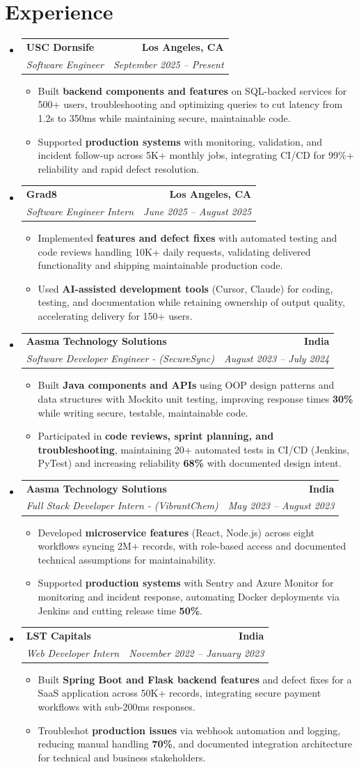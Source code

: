 \documentclass[letterpaper,10pt]{article}
\makeatletter
\newcommand{\resumeItem}[1]{\item\small{{#1 \vspace{-2pt}}}}
\newcommand{\resumeSubheading}[4]{\vspace{-1pt}\item\begin{tabular*}{1.0\textwidth}[t]{l@{\extracolsep{\fill}}r}\textbf{#1} & \textbf{\small #2} \\\textit{\small#3} & \textit{\small #4} \\\end{tabular*}\vspace{-2pt}}
\newcommand{\resumeSubHeadingListStart}{\begin{itemize}[leftmargin=0.0in, label={}]}
\newcommand{\resumeSubHeadingListEnd}{\end{itemize}}
\newcommand{\resumeItemListStart}{\begin{itemize}[leftmargin=0.15in,label=\textbullet,itemsep=2pt,topsep=0pt,parsep=0pt,partopsep=0pt]}
\newcommand{\resumeItemListEnd}{\end{itemize}\vspace{-4pt}}
\makeatother
\begin{document}
\section{Experience}
\resumeSubHeadingListStart
\resumeSubheading{USC Dornsife}{Los Angeles, CA}{Software Engineer}{September 2025 -- Present}
\resumeItemListStart
\resumeItem{Built \textbf{backend components and features} on SQL-backed services for 500+ users, troubleshooting and optimizing queries to cut latency from 1.2s to 350ms while maintaining secure, maintainable code.}
\resumeItem{Supported \textbf{production systems} with monitoring, validation, and incident follow-up across 5K+ monthly jobs, integrating CI/CD for 99\%+ reliability and rapid defect resolution.}
\resumeItemListEnd
\resumeSubheading{Grad8}{Los Angeles, CA}{Software Engineer Intern}{June 2025 -- August 2025}
\resumeItemListStart
\resumeItem{Implemented \textbf{features and defect fixes} with automated testing and code reviews handling 10K+ daily requests, validating delivered functionality and shipping maintainable production code.}
\resumeItem{Used \textbf{AI-assisted development tools} (Cursor, Claude) for coding, testing, and documentation while retaining ownership of output quality, accelerating delivery for 150+ users.}
\resumeItemListEnd
\resumeSubheading{Aasma Technology Solutions}{India}{Software Developer Engineer - (SecureSync)}{August 2023 -- July 2024}
\resumeItemListStart
\resumeItem{Built \textbf{Java components and APIs} using OOP design patterns and data structures with Mockito unit testing, improving response times \textbf{30\%} while writing secure, testable, maintainable code.}
\resumeItem{Participated in \textbf{code reviews, sprint planning, and troubleshooting}, maintaining 20+ automated tests in CI/CD (Jenkins, PyTest) and increasing reliability \textbf{68\%} with documented design intent.}
\resumeItemListEnd
\resumeSubheading{Aasma Technology Solutions}{India}{Full Stack Developer Intern - (VibrantChem)}{May 2023 -- August 2023}
\resumeItemListStart
\resumeItem{Developed \textbf{microservice features} (React, Node.js) across eight workflows syncing 2M+ records, with role-based access and documented technical assumptions for maintainability.}
\resumeItem{Supported \textbf{production systems} with Sentry and Azure Monitor for monitoring and incident response, automating Docker deployments via Jenkins and cutting release time \textbf{50\%}.}
\resumeItemListEnd
\resumeSubheading{LST Capitals}{India}{Web Developer Intern}{November 2022 -- January 2023}
\resumeItemListStart
\resumeItem{Built \textbf{Spring Boot and Flask backend features} and defect fixes for a SaaS application across 50K+ records, integrating secure payment workflows with sub-200ms responses.}
\resumeItem{Troubleshot \textbf{production issues} via webhook automation and logging, reducing manual handling \textbf{70\%}, and documented integration architecture for technical and business stakeholders.}
\resumeItemListEnd
\resumeSubHeadingListEnd
\vspace{-6pt}
\end{document}
